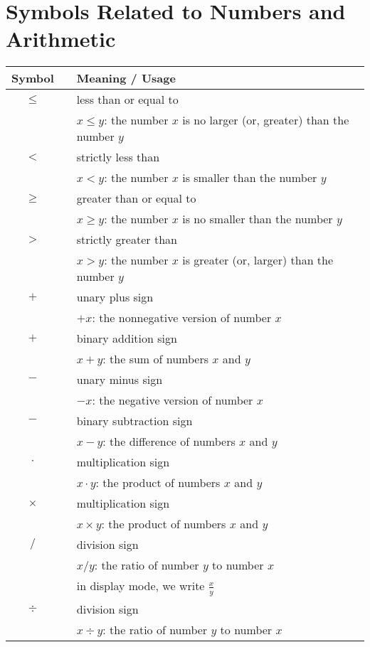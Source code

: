 \section*{Symbols Related to Numbers and Arithmetic}

\begin{tabular}{c|cl}
{\bf Symbol} & & {\bf Meaning} / {\bf Usage} \\ \hline
\hline
$\leq$
  & & less than or equal to  \\
  & & $x \leq y$: the number $x$ is no larger (or, greater) than the number $y$ \\ \hline
$<$
  & & strictly less than  \\
  & & $x < y$: the number $x$ is smaller than the number $y$ \\ \hline
$\geq$
  & & greater than or equal to  \\
  & & $x \geq y$: the number $x$ is no smaller than the number $y$ \\ \hline
$>$
  & & strictly greater than  \\
  & & $x > y$: the number $x$ is greater (or, larger) than the number $y$ \\ \hline
$+$
  & & unary plus sign \\
  & & $+x$: the nonnegative version of number $x$ \\ \hline
$+$
  & & binary addition sign \\
  & & $x+y$: the sum of numbers $x$ and $y$ \\ \hline
$-$
  & & unary minus sign \\
  & & $-x$: the negative version of number $x$ \\ \hline
$-$
  & & binary subtraction sign \\
  & & $x-y$: the difference of numbers $x$ and $y$ \\ \hline
$\cdot$
  & & multiplication sign \\
  & & $x \cdot y$: the product of numbers $x$ and $y$ \\
$\times$
  & & multiplication sign \\
  & & $x \times y$: the product of numbers $x$ and $y$ \\ \hline
$/$
  & & division sign \\
  & & $x / y$: the ratio of number $y$ to number $x$ \\
  & & in display mode, we write $\displaystyle \frac{x}{y}$ \\
$\div$
  & & division sign \\
  & & $x \div y$: the ratio of number $y$ to number $x$ \\ \hline

\end{tabular}
